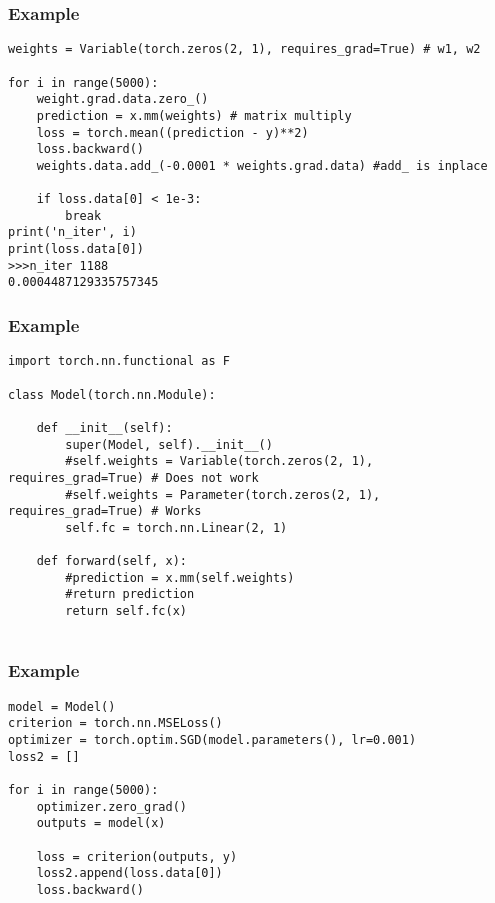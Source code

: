 \begin{frame}[fragile]
\frametitle{Example}
\begin{lstlisting}
weights = Variable(torch.zeros(2, 1), requires_grad=True) # w1, w2

for i in range(5000):
	weight.grad.data.zero_()
    prediction = x.mm(weights) # matrix multiply
    loss = torch.mean((prediction - y)**2)
    loss.backward()
    weights.data.add_(-0.0001 * weights.grad.data) #add_ is inplace
    
    if loss.data[0] < 1e-3:
        break
print('n_iter', i)
print(loss.data[0])
>>>n_iter 1188
0.0004487129335757345
\end{lstlisting}     
\end{frame} 

\begin{frame}[fragile]
\frametitle{Example}
\begin{lstlisting}
import torch.nn.functional as F

class Model(torch.nn.Module):
    
    def __init__(self):
        super(Model, self).__init__()
        #self.weights = Variable(torch.zeros(2, 1), requires_grad=True) # Does not work
		#self.weights = Parameter(torch.zeros(2, 1), requires_grad=True) # Works
		self.fc = torch.nn.Linear(2, 1)
    
    def forward(self, x):
        #prediction = x.mm(self.weights)
        #return prediction
		return self.fc(x) 
        
\end{lstlisting}     
\end{frame} 

\begin{frame}[fragile]
\frametitle{Example}
\begin{lstlisting}
model = Model()
criterion = torch.nn.MSELoss()
optimizer = torch.optim.SGD(model.parameters(), lr=0.001)
loss2 = []

for i in range(5000):
    optimizer.zero_grad()
    outputs = model(x)
    
    loss = criterion(outputs, y)
    loss2.append(loss.data[0])
    loss.backward()        
\end{lstlisting}     
\end{frame} 





